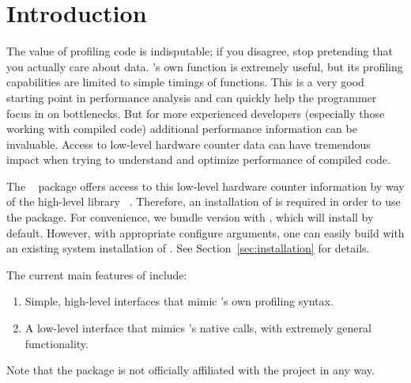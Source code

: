 \section{Introduction}
\label{sec:introduction}

The value of profiling code is indisputable; if you disagree, stop pretending that you actually care about data.  \R's own  function is extremely useful, but its profiling capabilities are limited to simple timings of \R functions. This is a very good starting point in performance analysis and can quickly help the \R programmer focus in on bottlenecks.  But for more experienced developers (especially those working with compiled code) additional performance information can be invaluable. Access to low-level hardware counter data can have tremendous impact when trying to understand and optimize performance of compiled code. 

The \thispackage~\citep{Schmidt2014pbdPAPIpackage} package offers access to this low-level hardware counter information by way of the high-level 
\C library \PAPI~\citep{mucci1999papi}.  Therefore, an installation of \PAPI is required in order to use the package.  For convenience, we bundle \PAPI version \PAPIversion with \thispackage, which will install by default.  However, with appropriate configure arguments, one can easily build \thispackage with an existing system installation of \PAPI.  See Section~\ref{sec:installation} for details.

The current main features of \thispackage include:
\begin{enumerate}
  \item Simple, high-level interfaces that mimic \R's own profiling syntax.
  \item A low-level interface that mimics \PAPI's native calls, with extremely general functionality.
\end{enumerate}

Note that the  package is not officially affiliated with the  project in any way.